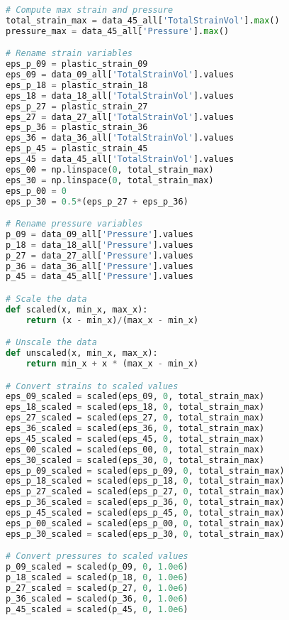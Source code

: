 \begin{lstlisting}[language=Python]
# Compute max strain and pressure
total_strain_max = data_45_all['TotalStrainVol'].max()
pressure_max = data_45_all['Pressure'].max()

# Rename strain variables
eps_p_09 = plastic_strain_09
eps_09 = data_09_all['TotalStrainVol'].values
eps_p_18 = plastic_strain_18
eps_18 = data_18_all['TotalStrainVol'].values
eps_p_27 = plastic_strain_27
eps_27 = data_27_all['TotalStrainVol'].values
eps_p_36 = plastic_strain_36
eps_36 = data_36_all['TotalStrainVol'].values
eps_p_45 = plastic_strain_45
eps_45 = data_45_all['TotalStrainVol'].values
eps_00 = np.linspace(0, total_strain_max)
eps_30 = np.linspace(0, total_strain_max)
eps_p_00 = 0
eps_p_30 = 0.5*(eps_p_27 + eps_p_36)

# Rename pressure variables
p_09 = data_09_all['Pressure'].values
p_18 = data_18_all['Pressure'].values
p_27 = data_27_all['Pressure'].values
p_36 = data_36_all['Pressure'].values
p_45 = data_45_all['Pressure'].values

# Scale the data
def scaled(x, min_x, max_x):
    return (x - min_x)/(max_x - min_x)

# Unscale the data
def unscaled(x, min_x, max_x):
    return min_x + x * (max_x - min_x)

# Convert strains to scaled values
eps_09_scaled = scaled(eps_09, 0, total_strain_max)
eps_18_scaled = scaled(eps_18, 0, total_strain_max)
eps_27_scaled = scaled(eps_27, 0, total_strain_max)
eps_36_scaled = scaled(eps_36, 0, total_strain_max)
eps_45_scaled = scaled(eps_45, 0, total_strain_max)
eps_00_scaled = scaled(eps_00, 0, total_strain_max)
eps_30_scaled = scaled(eps_30, 0, total_strain_max)
eps_p_09_scaled = scaled(eps_p_09, 0, total_strain_max)
eps_p_18_scaled = scaled(eps_p_18, 0, total_strain_max)
eps_p_27_scaled = scaled(eps_p_27, 0, total_strain_max)
eps_p_36_scaled = scaled(eps_p_36, 0, total_strain_max)
eps_p_45_scaled = scaled(eps_p_45, 0, total_strain_max)
eps_p_00_scaled = scaled(eps_p_00, 0, total_strain_max)
eps_p_30_scaled = scaled(eps_p_30, 0, total_strain_max)

# Convert pressures to scaled values
p_09_scaled = scaled(p_09, 0, 1.0e6)
p_18_scaled = scaled(p_18, 0, 1.0e6)
p_27_scaled = scaled(p_27, 0, 1.0e6)
p_36_scaled = scaled(p_36, 0, 1.0e6)
p_45_scaled = scaled(p_45, 0, 1.0e6)


\end{lstlisting}

